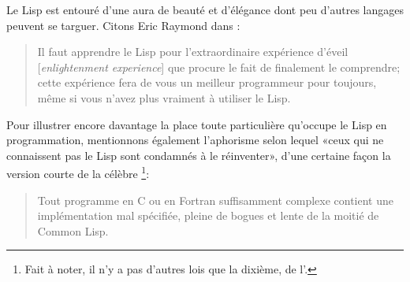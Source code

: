Le Lisp est entouré d'une aura de beauté et d'élégance dont peu
d'autres langages peuvent se targuer. Citons Eric Raymond dans
:
\begin{quote}
  Il faut apprendre le Lisp pour l'extraordinaire expérience d'éveil
  [\emph{enlightenment experience}] que procure le fait de finalement
  le comprendre; cette expérience fera de vous un meilleur programmeur
  pour toujours, même si vous n'avez plus vraiment à utiliser le Lisp.
\end{quote}

Pour illustrer encore davantage la place toute particulière qu'occupe
le Lisp en programmation, mentionnons également l'aphorisme selon
lequel «ceux qui ne connaissent pas le Lisp sont condamnés à le
réinventer», d'une certaine façon la version courte de la célèbre
\footnote{%
  Fait à noter, il n'y a pas d'autres lois que la dixième, de
  l'.}: %
\begin{quote}
  Tout programme en C ou en Fortran suffisamment complexe contient une
  implémentation mal spécifiée, pleine de bogues et lente de la moitié
  de Common Lisp.
\end{quote}

